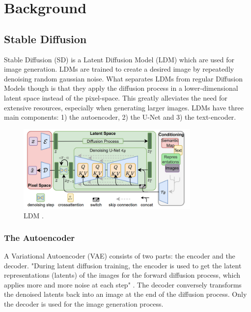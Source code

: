 \section{Background}



\subsection{Stable Diffusion}
Stable Diffusion (SD) is a Latent Diffusion Model (LDM) which are used for image generation. LDMs are trained to create a desired image by repeatedly denoising random gaussian noise. What separates LDMs from regular Diffusion Models though is that they apply the diffusion process in a lower-dimensional latent space instead of the pixel-space. This greatly alleviates the need for extensive resources, especially when generating larger images. LDMs have three main components: 1) the autoencoder, 2) the U-Net and 3) the text-encoder.
\begin{figure}[!htb]
\centering
\includegraphics[width=0.8\textwidth]
{static/LDM.png}
\caption{LDM \cite[Fig.~3]{Rombach_2022_CVPR}.}
\label{fig:ldm}
\end{figure}



\subsubsection{The Autoencoder}
A Variational Autoencoder (VAE) consists of two parts: the encoder and the decoder. "During latent diffusion training, the encoder is used to get the latent representations (latents) of the images for the forward diffusion process, which applies more and more noise at each step" \cite{patil2022stable}. The decoder conversely transforms the denoised latents back into an image at the end of the diffusion process. Only the decoder is used for the image generation process.



